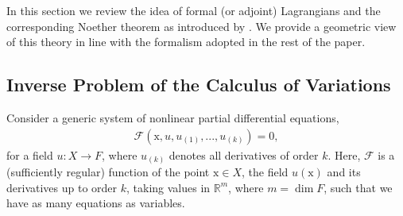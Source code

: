 \documentclass[12pt,a4paper,reqno]{article}
\begin{document}
In this section we review the idea of formal (or adjoint) Lagrangians \cite{AthertonHomsy:1975} and the corresponding Noether theorem as introduced by \citet{Ibragimov:2007a}. 
We provide a geometric view of this theory in line with the formalism adopted in the rest of the paper.

\subsection{Inverse Problem of the Calculus of Variations}
\label{sec:inverse_problem}

Consider a generic system of nonlinear partial differential equations,
\begin{align}\label{eq:formal_lagrangians_system_of_pdes}
\mathcal{F} ({\ensuremath{{\ensuremath{\mathrm{{x}}}}}}, {\ensuremath{{\ensuremath{{u}}}}}, {\ensuremath{{\ensuremath{{u}}}}}_{(1)}, ..., {\ensuremath{{\ensuremath{{u}}}}}_{(k)}) = 0 ,
\end{align}
for a field ${\ensuremath{{\ensuremath{{u}}}}} : X \rightarrow F$, where ${\ensuremath{{\ensuremath{{u}}}}}_{(k)}$ denotes all derivatives of order $k$.
Here, $\mathcal{F}$ is a (sufficiently regular) function of the point ${\ensuremath{{\ensuremath{\mathrm{{x}}}}}} \in X$, the field ${\ensuremath{{\ensuremath{{u}}}}} ({\ensuremath{{\ensuremath{\mathrm{{x}}}}}})$ and its derivatives up to order $k$, taking values in $\mathbb{R}^{m}$, where $m = \dim F$, such that we have as many equations as variables.
\end{document}
